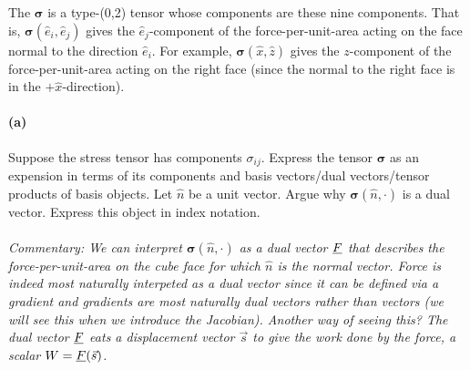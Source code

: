 \documentclass{article}
\def\stress{\boldsymbol{\sigma}}
\begin{document}
The  $\stress$ is a type-(0,2) tensor whose components are these nine components.  That is, $\stress(\hat{e}_{i},\hat{e}_{j})$ gives
the $\hat{e}_{j}$-component of the force-per-unit-area acting on the face normal to the direction $\hat{e}_{i}$.  For example, $\stress(\hat{x},\hat{z})$ gives the
$z$-component of the force-per-unit-area acting on the right face (since the normal to the right face is in the $+\hat{x}$-direction).


\phline
\paragraph{(a)}		\extrapart
Suppose the stress tensor has components $\sigma_{ij}$.  Express the tensor $\stress$ as an expension in terms of its components and basis vectors/dual vectors/tensor products of
basis objects.  Let $\hat{n}$ be a unit vector.  Argue why $\stress(\hat{n},\cdot)$ is a dual vector.  Express this object in index notation.

\paragraph{}
\textit{Commentary:  We can interpret $\stress(\hat{n},\cdot)$ as a dual vector $\underline{F}$ that describes the force-per-unit-area on the cube face for which $\hat{n}$ is the 
normal vector.  Force is indeed most naturally interpeted as a dual vector since it can be defined via a gradient and gradients are most naturally dual vectors rather than 
vectors (we will see this when we introduce the Jacobian). Another way of seeing this?  The dual vector $\underline{F}$ eats a displacement vector $\vec{s}$ to give the
work done by the force, a scalar $W=\underline{F}(\vec{s})$.}

\phline
\end{document}
